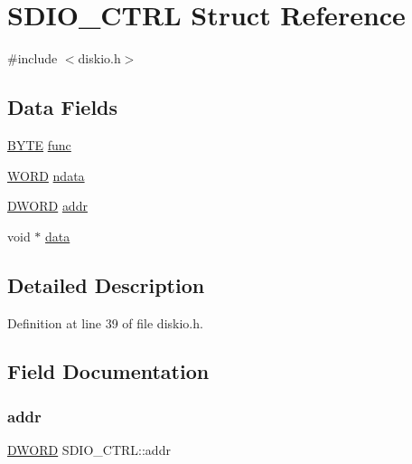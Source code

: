 \hypertarget{structSDIO__CTRL}{}\section{S\+D\+I\+O\+\_\+\+C\+T\+RL Struct Reference}
\label{structSDIO__CTRL}


{\ttfamily \#include $<$diskio.\+h$>$}

\subsection*{Data Fields}
\begin{DoxyCompactItemize}
\item 
\hyperlink{ff_8h_a4ae1dab0fb4b072a66584546209e7d58}{B\+Y\+TE} \hyperlink{structSDIO__CTRL_a2f0a17848a6c7c58f826d1888469e6e3}{func}
\item 
\hyperlink{ff_8h_a197942eefa7db30960ae396d68339b97}{W\+O\+RD} \hyperlink{structSDIO__CTRL_a44edc7d37688ac4f3a1ba3d66e909767}{ndata}
\item 
\hyperlink{ff_8h_ad342ac907eb044443153a22f964bf0af}{D\+W\+O\+RD} \hyperlink{structSDIO__CTRL_a15025848d3f3733f366504d30a1d9bb2}{addr}
\item 
void $\ast$ \hyperlink{structSDIO__CTRL_ab04c9adb4d3027a14925fb30b469f0c0}{data}
\end{DoxyCompactItemize}


\subsection{Detailed Description}


Definition at line 39 of file diskio.\+h.



\subsection{Field Documentation}
\mbox{\label{structSDIO__CTRL_a15025848d3f3733f366504d30a1d9bb2}} 
\subsubsection{\texorpdfstring{addr}{addr}}
{\footnotesize\ttfamily \hyperlink{ff_8h_ad342ac907eb044443153a22f964bf0af}{D\+W\+O\+RD} S\+D\+I\+O\+\_\+\+C\+T\+R\+L\+::addr}



